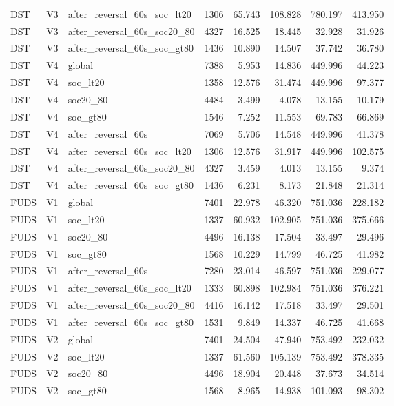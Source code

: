 \begin{tabular}{lllrrrrr}
DST & V3 & after\_reversal\_60s\_soc\_lt20 & 1306 & 65.743 & 108.828 & 780.197 & 413.950 \\
DST & V3 & after\_reversal\_60s\_soc20\_80 & 4327 & 16.525 & 18.445 & 32.928 & 31.926 \\
DST & V3 & after\_reversal\_60s\_soc\_gt80 & 1436 & 10.890 & 14.507 & 37.742 & 36.780 \\
DST & V4 & global & 7388 & 5.953 & 14.836 & 449.996 & 44.223 \\
DST & V4 & soc\_lt20 & 1358 & 12.576 & 31.474 & 449.996 & 97.377 \\
DST & V4 & soc20\_80 & 4484 & 3.499 & 4.078 & 13.155 & 10.179 \\
DST & V4 & soc\_gt80 & 1546 & 7.252 & 11.553 & 69.783 & 66.869 \\
DST & V4 & after\_reversal\_60s & 7069 & 5.706 & 14.548 & 449.996 & 41.378 \\
DST & V4 & after\_reversal\_60s\_soc\_lt20 & 1306 & 12.576 & 31.917 & 449.996 & 102.575 \\
DST & V4 & after\_reversal\_60s\_soc20\_80 & 4327 & 3.459 & 4.013 & 13.155 & 9.374 \\
DST & V4 & after\_reversal\_60s\_soc\_gt80 & 1436 & 6.231 & 8.173 & 21.848 & 21.314 \\
FUDS & V1 & global & 7401 & 22.978 & 46.320 & 751.036 & 228.182 \\
FUDS & V1 & soc\_lt20 & 1337 & 60.932 & 102.905 & 751.036 & 375.666 \\
FUDS & V1 & soc20\_80 & 4496 & 16.138 & 17.504 & 33.497 & 29.496 \\
FUDS & V1 & soc\_gt80 & 1568 & 10.229 & 14.799 & 46.725 & 41.982 \\
FUDS & V1 & after\_reversal\_60s & 7280 & 23.014 & 46.597 & 751.036 & 229.077 \\
FUDS & V1 & after\_reversal\_60s\_soc\_lt20 & 1333 & 60.898 & 102.984 & 751.036 & 376.221 \\
FUDS & V1 & after\_reversal\_60s\_soc20\_80 & 4416 & 16.142 & 17.518 & 33.497 & 29.501 \\
FUDS & V1 & after\_reversal\_60s\_soc\_gt80 & 1531 & 9.849 & 14.337 & 46.725 & 41.668 \\
FUDS & V2 & global & 7401 & 24.504 & 47.940 & 753.492 & 232.032 \\
FUDS & V2 & soc\_lt20 & 1337 & 61.560 & 105.139 & 753.492 & 378.335 \\
FUDS & V2 & soc20\_80 & 4496 & 18.904 & 20.448 & 37.673 & 34.514 \\
FUDS & V2 & soc\_gt80 & 1568 & 8.965 & 14.938 & 101.093 & 98.302 \\

\end{tabular}
